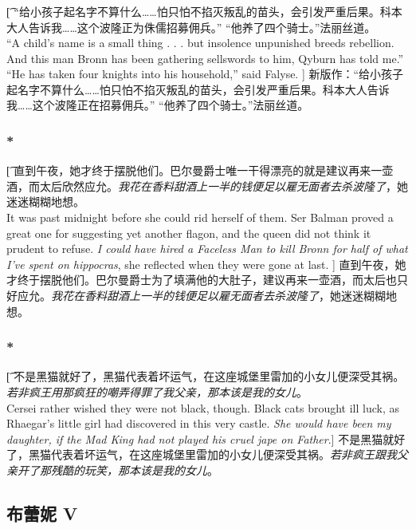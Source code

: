 \documentclass[12pt,a4paper]{article}
\begin{document}
\subsubsection{}\t[
	“给小孩子起名字不算什么……怕只怕不掐灭叛乱的苗头，会引发严重后果。科本大人告诉我……这个波隆正为侏儒招募佣兵。” “他养了四个骑士。”法丽丝道。\\
	“A child's name is a small thing . . . but insolence unpunished breeds rebellion. And this man Bronn has been gathering sellswords to him, Qyburn has told me.” “He has taken four knights into his household,” said Falyse. ]
	新版作：“给小孩子起名字不算什么……怕只怕不掐灭叛乱的苗头，会引发严重后果。科本大人告诉我……这个波隆正在招募佣兵。” “他养了四个骑士。”法丽丝道。
	
\subsubsection{\color{red}*}\t[
	直到午夜，她才终于摆脱他们。巴尔曼爵士唯一干得漂亮的就是建议再来一壶酒，而太后欣然应允。\emph{我花在香料甜酒上一半的钱便足以雇无面者去杀波隆了}，她迷迷糊糊地想。\\
	It was past midnight before she could rid herself of them. Ser Balman proved a great one for suggesting yet another flagon, and the queen did not think it prudent to refuse. \emph{I could have hired a Faceless Man to kill Bronn for half of what I've spent on hippocras}, she reflected when they were gone at last. ]
	直到午夜，她才终于摆脱他们。巴尔曼爵士为了填满他的大肚子，建议再来一壶酒，而太后也只好应允。\emph{我花在香料甜酒上一半的钱便足以雇无面者去杀波隆了}，她迷迷糊糊地想。
	
\subsubsection{\color{red}*}\t[
		不是黑猫就好了，黑猫代表着坏运气，在这座城堡里雷加的小女儿便深受其祸。\emph{若非疯王用那疯狂的嘲弄得罪了我父亲，那本该是我的女儿}。\\
		Cersei rather wished they were not black, though. Black cats brought ill luck, as Rhaegar's little girl had discovered in this very castle. \emph{She would have been my daughter, if the Mad King had not played his cruel jape on Father}.]
		不是黑猫就好了，黑猫代表着坏运气，在这座城堡里雷加的小女儿便深受其祸。\emph{若非疯王跟我父亲开了那残酷的玩笑，那本该是我的女儿}。
		 	
\subsection{布蕾妮 V}
\end{document}
